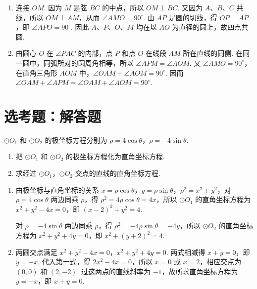 \begin{solution}
\begin{enumerate}
\item 连接 \(OM\). 因为 \(M\) 是弦 \(BC\) 的中点，所以 \(OM\perp BC\). 又因为 \(A\)、\(B\)、\(C\) 共线，所以 \(OM\perp AM\)，从而 \(\angle AMO=90^\circ\). 由 \(AP\) 是圆的切线，得 \(OP\perp AP\)，即 \(\angle APO=90^\circ\). 因此 \(A\)、\(P\)、\(O\)、\(M\) 均在以 \(AO\) 为直径的圆上，故四点共圆.
\item 由圆心 \(O\) 在 \(\angle PAC\) 的内部，点 \(P\) 和点 \(O\) 在线段 \(AM\) 所在直线的同侧. 在同一圆中，同弧所对的圆周角相等，所以 \(\angle APM=\angle AOM\). 又 \(\angle AMO=90^\circ\)，在直角三角形 \(AOM\) 中，\(\angle OAM+\angle AOM=90^\circ\). 因而
\(\angle OAM+\angle APM=\angle OAM+\angle AOM=90^\circ\).
\end{enumerate}
\end{solution}

\FloatBarrier

\section{选考题：解答题}

\begin{problem}
\(\odot O_{1}\) 和 \(\odot O_{2}\) 的极坐标方程分别为 \(\rho = 4\cos \theta\)，\(\rho = -4\sin \theta\).
\begin{enumerate}
\item 把 \(\odot O_{1}\) 和 \(\odot O_{2}\) 的极坐标方程化为直角坐标方程.
\item 求经过 \(\odot O_{1}\)，\(\odot O_{2}\) 交点的直线的直角坐标方程.
\end{enumerate}
\end{problem}

\begin{solution}
\begin{enumerate}
\item 由极坐标与直角坐标的关系 \(x=\rho\cos\theta\)，\(y=\rho\sin\theta\)，\(\rho^{2}=x^{2}+y^{2}\)，对 \(\rho=4\cos\theta\) 两边同乘 \(\rho\)，得 \(\rho^{2}=4\rho\cos\theta=4x\)，所以 \(\odot O_{1}\) 的直角坐标方程为 \(x^{2}+y^{2}-4x=0\)，即 \((x-2)^{2}+y^{2}=4\).

对 \(\rho=-4\sin\theta\) 两边同乘 \(\rho\)，得 \(\rho^{2}=-4\rho\sin\theta=-4y\)，所以 \(\odot O_{2}\) 的直角坐标方程为 \(x^{2}+y^{2}+4y=0\)，即 \(x^{2}+(y+2)^{2}=4\).
\item 两圆交点满足
\(x^{2}+y^{2}-4x=0\)，\(x^{2}+y^{2}+4y=0\). 两式相减得 \(x+y=0\)，即 \(y=-x\). 代入第一式，得 \(2x^{2}-4x=0\)，所以 \(x=0\) 或 \(x=2\)，相应交点为 \((0,0)\) 和 \((2,-2)\). 过这两点的直线斜率为 \(-1\)，故所求直角坐标方程为 \(y=-x\)，即 \(x+y=0\).
\end{enumerate}
\end{solution}

